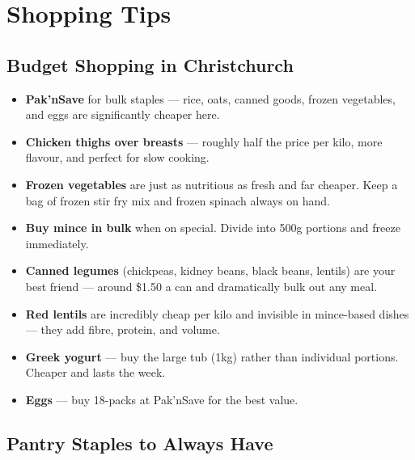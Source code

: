 \documentclass[12pt, a4paper]{book}
\begin{document}
\chapter{Shopping Tips}

\section*{Budget Shopping in Christchurch}

\begin{itemize}[leftmargin=1.5em, itemsep=6pt]
  \item \textbf{Pak'nSave} for bulk staples --- rice, oats, canned goods, frozen vegetables, and eggs are significantly cheaper here.
  \item \textbf{Chicken thighs over breasts} --- roughly half the price per kilo, more flavour, and perfect for slow cooking.
  \item \textbf{Frozen vegetables} are just as nutritious as fresh and far cheaper. Keep a bag of frozen stir fry mix and frozen spinach always on hand.
  \item \textbf{Buy mince in bulk} when on special. Divide into 500g portions and freeze immediately.
  \item \textbf{Canned legumes} (chickpeas, kidney beans, black beans, lentils) are your best friend --- around \$1.50 a can and dramatically bulk out any meal.
  \item \textbf{Red lentils} are incredibly cheap per kilo and invisible in mince-based dishes --- they add fibre, protein, and volume.
  \item \textbf{Greek yogurt} --- buy the large tub (1kg) rather than individual portions. Cheaper and lasts the week.
  \item \textbf{Eggs} --- buy 18-packs at Pak'nSave for the best value.
\end{itemize}

\section*{Pantry Staples to Always Have}
\end{document}
